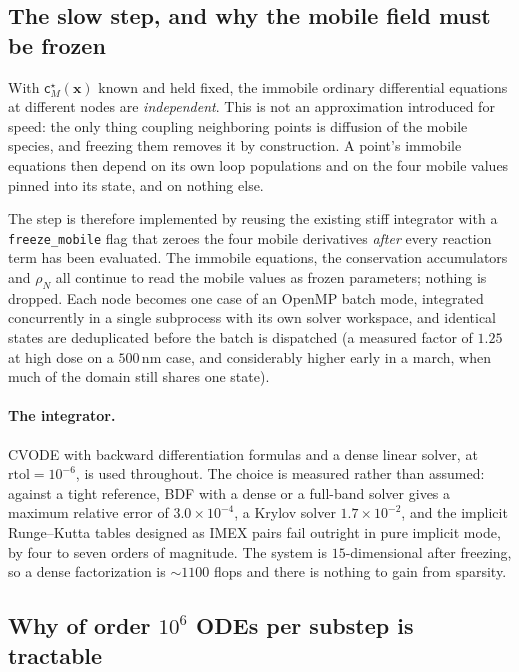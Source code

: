 \documentclass{article}
\newcommand{\spvec}[1]{\bm{\mathsf{#1}}}   %
\newcommand{\code}[1]{\texttt{#1}}
\begin{document}
\subsection{The slow step, and why the mobile field must be frozen}
\label{sec:slow}

With $\spvec c^\star_M(\bm x)$ known and held fixed, the immobile ordinary
differential equations at different nodes are \emph{independent}. This is not an
approximation introduced for speed: the only thing coupling neighboring points is
diffusion of the mobile species, and freezing them removes it by construction. A
point's immobile equations then depend on its own loop populations and on the
four mobile values pinned into its state, and on nothing else.

The step is therefore implemented by reusing the existing stiff integrator with a
\code{freeze\_mobile} flag that zeroes the four mobile derivatives \emph{after}
every reaction term has been evaluated. The immobile equations, the conservation
accumulators and $\rho_N$ all continue to read the mobile values as frozen
parameters; nothing is dropped. Each node becomes one case of an OpenMP batch
mode, integrated concurrently in a single subprocess with its own solver
workspace, and identical states are deduplicated before the batch is dispatched
(a measured factor of $1.25$ at high dose on a $500\,$nm case, and considerably
higher early in a march, when much of the domain still shares one state).

\paragraph{The integrator.} CVODE with backward differentiation formulas and a
dense linear solver, at $\mathrm{rtol}=10^{-6}$, is used throughout. The choice
is measured rather than assumed: against a tight reference, BDF with a dense or a
full-band solver gives a maximum relative error of $3.0\times10^{-4}$, a Krylov
solver $1.7\times10^{-2}$, and the implicit Runge--Kutta tables designed as IMEX
pairs fail outright in pure implicit mode, by four to seven orders of magnitude.
The system is $15$-dimensional after freezing, so a dense factorization is $\sim
1100$ flops and there is nothing to gain from sparsity.

\subsection{Why of order $10^{6}$ ODEs per substep is tractable}
\label{sec:cost}
\end{document}
